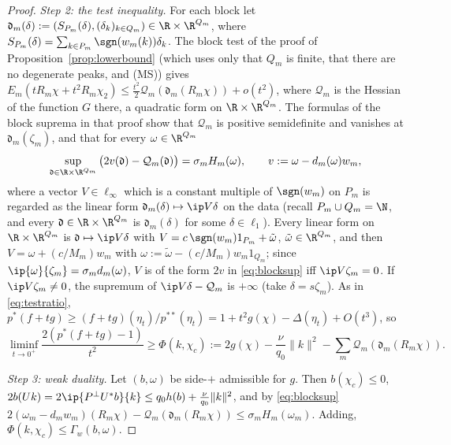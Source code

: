 \begin{proof}
\emph{Step 2: the test inequality.}  For each block let
$\mathfrak d_m(\delta):=(S_{P_m}(\delta),(\delta_k)_{k\in Q_m})\in
\R\times\R^{Q_m}$, where $S_{P_m}(\delta)=\sum_{k\in P_m}\sgn(w_m(k))\delta_k$.
The block test of the proof of Proposition~\ref{prop:lowerbound} (which uses
only that $Q_m$ is finite, that there are no degenerate peaks, and
\textup{(MS)}) gives $E_m(tR_m\chi+t^2R_m\chi_2)\le\frac{t^2}2\mathcal
Q_m(\mathfrak d_m(R_m\chi))+o(t^2)$, where $\mathcal Q_m$ is the Hessian
of the function $G$ there, a quadratic form on $\R\times\R^{Q_m}$.  The
formulas of the block suprema in that proof show that $\mathcal Q_m$ is
positive semidefinite and vanishes at $\mathfrak d_m(\zeta_m)$, and that
for every $\omega\in\R^{Q_m}$
\begin{equation}\label{eq:blocksup}
 \sup_{\mathfrak d\in\R\times\R^{Q_m}}\big(2v(\mathfrak d)-\mathcal Q_m(
 \mathfrak d)\big)=\sigma_mH_m(\omega),\qquad v:=\omega-d_m(\omega)w_m,
\end{equation}
where a vector $V\in\ell_\infty$ which is a constant multiple of
$\sgn(w_m)$ on $P_m$ is regarded as the linear form
$\mathfrak d_m(\delta)\mapsto\ip V\delta$ on the data (recall
$P_m\cup Q_m=\N$, and every $\mathfrak d\in\R\times\R^{Q_m}$ is
$\mathfrak d_m(\delta)$ for some $\delta\in\ell_1$).  Every linear form
on $\R\times\R^{Q_m}$ is $\mathfrak d\mapsto\ip V\delta$ with
$V=c\,\sgn(w_m)1_{P_m}+\tilde\omega$, $\tilde\omega\in\R^{Q_m}$, and then
$V=\omega+(c/M_m)w_m$ with $\omega:=\tilde\omega-(c/M_m)w_m1_{Q_m}$; since
$\ip{\omega}{\zeta_m}=\sigma_md_m(\omega)$, $V$ is of the form $2v$ in
\eqref{eq:blocksup} iff $\ip V{\zeta_m}=0$.  If $\ip V{\zeta_m}\ne0$, the
supremum of $\ip V\delta-\mathcal Q_m$ is $+\infty$ (take
$\delta=s\zeta_m$).  As in \eqref{eq:testratio}, $p^*(f+tg)\ge
(f+tg)(\eta_t)/p^{**}(\eta_t)=1+t^2g(\chi)-\Delta(\eta_t)+O(t^3)$, so
\[
 \liminf_{t\to0^+}\frac{2(p^*(f+tg)-1)}{t^2}\ge\Phi(k,\chi_c):=2g(\chi)
 -\frac\nu{q_0}\|k\|^2-\sum_m\mathcal Q_m(\mathfrak d_m(R_m\chi)).
\]

\emph{Step 3: weak duality.}  Let $(b,\omega)$ be side-$+$ admissible for
$g$.  Then $b(\chi_c)\le0$, $2b(Uk)=2\ip{P^\perp U^*b}{k}\le q_0h(b)+
\frac\nu{q_0}\|k\|^2$, and by \eqref{eq:blocksup}
$2(\omega_m-d_mw_m)(R_m\chi)-\mathcal Q_m(\mathfrak d_m(R_m\chi))\le
\sigma_mH_m(\omega_m)$.  Adding, $\Phi(k,\chi_c)\le\Gamma_w(b,\omega)$.


\end{proof}
